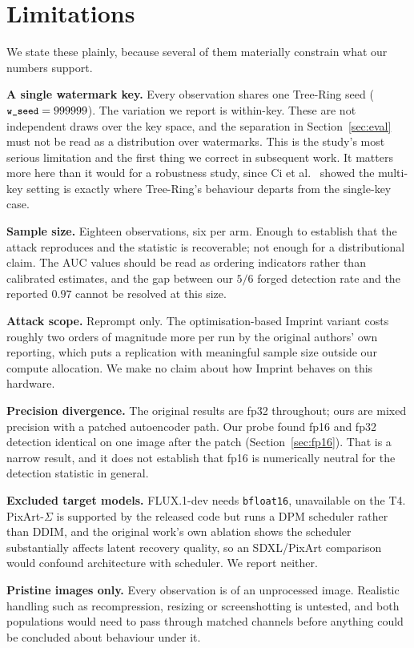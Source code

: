 \documentclass[10pt,twocolumn]{article}
\newcommand{\code}[1]{\texttt{\small #1}}
\begin{document}
\section{Limitations}
\label{sec:limits}

We state these plainly, because several of them materially constrain what our numbers
support.

\textbf{A single watermark key.} Every observation shares one Tree-Ring seed
($\code{w\_seed} = 999999$). The variation we report is within-key. These are not
independent draws over the key space, and the separation in Section~\ref{sec:eval}
must not be read as a distribution over watermarks. This is the study's most serious
limitation and the first thing we correct in subsequent work. It matters more here
than it would for a robustness study, since Ci et al.~\cite{ci2024ringid} showed the
multi-key setting is exactly where Tree-Ring's behaviour departs from the single-key
case.

\textbf{Sample size.} Eighteen observations, six per arm. Enough to establish that the
attack reproduces and the statistic is recoverable; not enough for a distributional
claim. The AUC values should be read as ordering indicators rather than calibrated
estimates, and the gap between our $5/6$ forged detection rate and the reported $0.97$
cannot be resolved at this size.

\textbf{Attack scope.} Reprompt only. The optimisation-based Imprint variant costs
roughly two orders of magnitude more per run by the original authors' own reporting,
which puts a replication with meaningful sample size outside our compute allocation.
We make no claim about how Imprint behaves on this hardware.

\textbf{Precision divergence.} The original results are fp32 throughout; ours are mixed
precision with a patched autoencoder path. Our probe found fp16 and fp32 detection
identical on one image after the patch (Section~\ref{sec:fp16}). That is a narrow
result, and it does not establish that fp16 is numerically neutral for the detection
statistic in general.

\textbf{Excluded target models.} FLUX.1-dev needs \code{bfloat16}, unavailable on the
T4. PixArt-$\Sigma$ is supported by the released code but runs a DPM scheduler rather
than DDIM, and the original work's own ablation shows the scheduler substantially
affects latent recovery quality, so an SDXL/PixArt comparison would confound
architecture with scheduler. We report neither.

\textbf{Pristine images only.} Every observation is of an unprocessed image. Realistic
handling such as recompression, resizing or screenshotting is untested, and both
populations would need to pass through matched channels before anything could be
concluded about behaviour under it.
\end{document}
